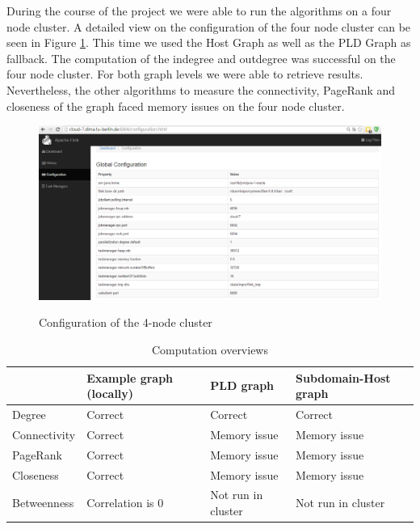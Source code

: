During the course of the project we were able to run the algorithms on a four node cluster. A detailed view on the configuration of the four node cluster can be seen in Figure \ref{fig6a}. This time we used the Host Graph as well as the PLD Graph as fallback. The computation of the indegree and outdegree was successful on the four node cluster. For both graph levels we were able to retrieve results. Nevertheless, the other algorithms to measure the connectivity, PageRank and closeness of the graph faced memory issues on the four node cluster.

\begin{figure}[H]
	\begin{center}
		\label{fig6a}		
		\includegraphics[width=1.0\textwidth]{fig6a}	
		\caption{Configuration of the 4-node cluster}	
	\end{center}
\end{figure}

\begin{table}[H]
	\caption{Computation overviews}
	\label{t3}
	\begin{center}
		\begin{tabular}{|l|l|l|l|}
			\hline		
				&Example graph (locally)	&PLD graph	&Subdomain-Host graph \\ \hline
			Degree	&Correct	&Correct	&Correct \\ \hline
			Connectivity	&Correct	&Memory issue	&Memory issue	\\ \hline
			PageRank	&Correct	&Memory issue	&Memory issue	\\ \hline
			Closeness	&Correct	&Memory issue	&Memory issue	\\ \hline
			Betweenness	&Correlation is 0	&Not run in cluster	&Not run in cluster	\\ \hline
		\end{tabular}
	\end{center}
\end{table}

